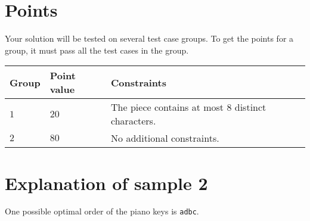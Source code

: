 \section*{Points}
Your solution will be tested on several test case groups.
To get the points for a group, it must pass all the test cases in the group.

\noindent
\begin{tabular}{| l | l | p{12cm} |}
  \hline
  \textbf{Group} & \textbf{Point value} & \textbf{Constraints} \\ \hline
  $1$    & $20$       & The piece contains at most $8$ distinct characters. \\ \hline
  $2$    & $80$       & No additional constraints. \\ \hline
\end{tabular}

\section*{Explanation of sample 2}

One possible optimal order of the piano keys is \texttt{adbc}.
